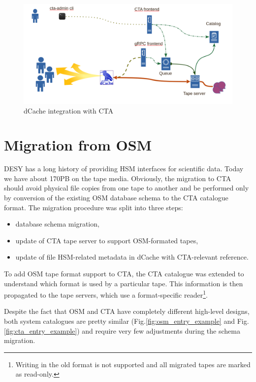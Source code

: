\documentclass{webofc}
\begin{document}
\begin{figure}[h]
    \centering
    \includegraphics[scale=0.25]{dcache-cta-integration.png}
    \caption{dCache integration with CTA}
    \label{fig:dcache_integration}
\end{figure}

\section{Migration from OSM}
\label{migraion}

DESY has a long history of providing HSM interfaces for scientific data. Today we have about 170PB on the tape media. Obviously, the migration to CTA should avoid physical file copies from one tape to another and be performed only by conversion of the existing OSM database schema to the CTA catalogue format. The migration procedure was split into three steps:
\begin{itemize}
    \item database schema migration,
    \item update of CTA tape server to support OSM-formated tapes,
    \item update of file HSM-related metadata in dCache with CTA-relevant reference.
\end{itemize}

To add OSM tape format support to CTA, the CTA catalogue was extended to understand 
which format is used by a particular tape. This information is then propagated to the tape servers, which use a format-specific reader\footnote{Writing in the old format is not supported and all migrated tapes are marked as read-only.}.

Despite the fact that OSM and CTA have completely different high-level designs, both system catalogues are pretty similar (Fig.\ref{fig:osm_entry_example} and Fig.\ref{fig:cta_entry_example}) and require very few adjustments during the schema migration.
\end{document}
